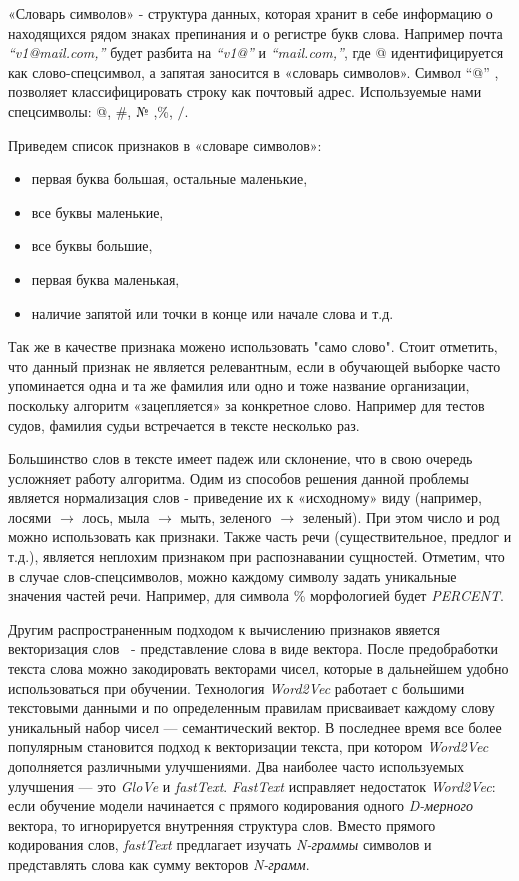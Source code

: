 \documentclass{csmathnotes}
\begin{document}
«Словарь символов» - структура данных, которая хранит в себе информацию о находящихся рядом знаках препинания и о регистре букв слова.
Например почта \emph{“v1@mail.com,”} будет разбита на \emph{“v1@”} и \emph{“mail.com,”}, где @ идентифицируется как слово-спецсимвол, а запятая заносится в «словарь символов». Символ “@” , позволяет классифицировать строку как почтовый адрес. Используемые нами спецсимволы: @, \#, № ,\%, $/$.


Приведем список признаков в «словаре символов»:
\begin{itemize}
    \item первая буква большая, остальные маленькие,
    \item все буквы маленькие,
    \item все буквы большие,
    \item первая буква маленькая,
    \item наличие запятой или точки в конце или начале слова и т.д.
\end{itemize}


Так же в качестве признака можено использовать "само слово". Стоит отметить, что данный признак не является релевантным, если в обучающей выборке часто упоминается одна и та же фамилия или одно и тоже название организации, поскольку алгоритм «зацепляется» за конкретное слово.
Например для тестов судов, фамилия судьи встречается в тексте несколько раз.


Большинство слов в тексте имеет падеж или склонение, что в свою очередь усложняет работу алгоритма.
Одим из способов решения данной проблемы является нормализация слов - приведение их к «исходному» виду
(например, лосями $\rightarrow$  лось, мыла $\rightarrow$ мыть, зеленого $\rightarrow$ зеленый).
При этом число и род можно использовать как признаки.
Также часть речи (существительное, предлог и т.д.), является неплохим признаком при распознавании сущностей.
Отметим, что в случае слов-спецсимволов, можно каждому символу задать уникальные значения частей речи.
Например, для символа \% морфологией будет \emph{PERCENT}.

 
Другим распространенным подходом к вычислению признаков явяется векторизация слов~\cite{w2v} -  представление слова в виде вектора.
После предобработки текста слова можно закодировать векторами чисел, которые в дальнейшем удобно использоваться при обучении.
Технология \emph{Word2Vec} работает с большими текстовыми данными и по определенным правилам присваивает каждому слову уникальный набор чисел — семантический вектор. В последнее время все более популярным становится подход к векторизации текста, при котором \emph{Word2Vec} дополняется различными улучшениями. Два наиболее часто используемых улучшения — это \emph{GloVe} и \emph{fastText}. \emph{FastText} исправляет недостаток \emph{Word2Vec}: если обучение модели начинается с прямого кодирования одного \emph{D-мерного} вектора, то игнорируется внутренняя структура слов. Вместо прямого кодирования слов, \emph{fastText} предлагает изучать \emph{N-граммы} символов и представлять слова как сумму векторов \emph{N-грамм}.
\end{document}
